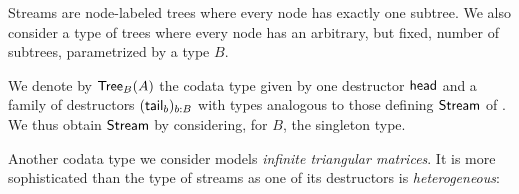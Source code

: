 \documentclass[envcountsame]{llncs}
\begin{document}
\begin{Long}

Streams are node-labeled trees where every node has exactly one subtree.
We also consider a type of trees where every node has an arbitrary, but fixed, number of subtrees, 
parametrized by a type $B$.



\begin{example}\label{ex_trees}
 We denote by $\mathsf{Tree}_B(A)$ the codata type given by one destructor $\mathsf{head}$ and a family of 
 destructors $(\mathsf{tail}_b)_{b:B}$ with types analogous to those defining $\mathsf{Stream}$ of .
 We thus obtain $\mathsf{Stream}$ by considering, for $B$, the singleton type.
\end{example}

\end{Long}

Another codata type we consider models
\emph{infinite triangular matrices}. It is more sophisticated than the type of streams as one of its destructors is \emph{heterogeneous}:
\end{document}
